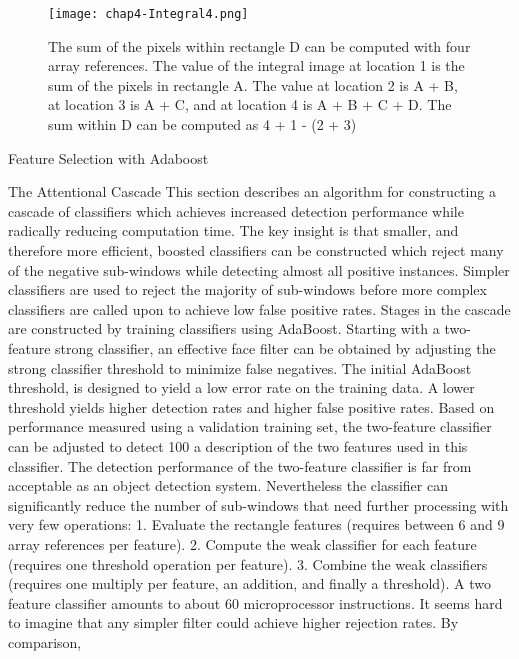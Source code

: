 \begin{compactitem}
\begin{figure}[h]
  \centering
	\texttt{[image: chap4-Integral4.png]}
  \caption{The sum of the pixels within rectangle D can be computed with four array
references. The value of the integral image at location 1 is the sum of the pixels in
rectangle A. The value at location 2 is A + B, at location 3 is A + C, and at location
4 is A + B + C + D. The sum within D can be computed as 4 + 1 - (2 + 3)}
  \label{fig:chap4-Integral4}
\end{figure}


\item {Feature Selection with Adaboost}
\item {The Attentional Cascade}
This section describes an algorithm for constructing a cascade of classifiers which
achieves increased detection performance while radically reducing computation time.
The key insight is that smaller, and therefore more efficient, boosted classifiers can be
constructed which reject many of the negative sub-windows while detecting almost all
positive instances. Simpler classifiers are used to reject the majority of sub-windows
before more complex classifiers are called upon to achieve low false positive rates.
Stages in the cascade are constructed by training classifiers using AdaBoost. Starting
with a two-feature strong classifier, an effective face filter can be obtained by adjusting
the strong classifier threshold to minimize false negatives. The initial AdaBoost
threshold, 
is designed to yield a low error rate on the training data. A lower
threshold yields higher detection rates and higher false positive rates. Based on performance
measured using a validation training set, the two-feature classifier can be
adjusted to detect 100%
a description of the two features used in this classifier.
The detection performance of the two-feature classifier is far from acceptable as an
object detection system. Nevertheless the classifier can significantly reduce the number
of sub-windows that need further processing with very few operations:
1. Evaluate the rectangle features (requires between 6 and 9 array references per
feature).
2. Compute the weak classifier for each feature (requires one threshold operation
per feature).
3. Combine the weak classifiers (requires one multiply per feature, an addition, and
finally a threshold).
A two feature classifier amounts to about 60 microprocessor instructions. It seems
hard to imagine that any simpler filter could achieve higher rejection rates. By comparison,

\end{compactitem}
